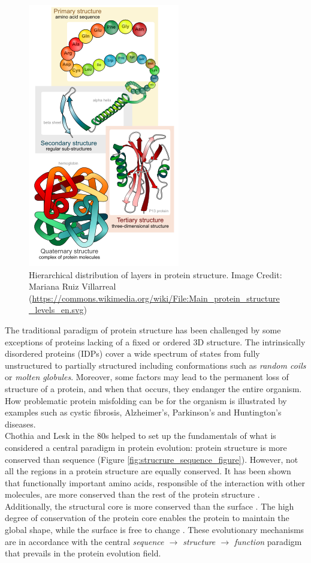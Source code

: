 \documentclass[11pt, b5paper,twoside]{tesi_upf}
\begin{document}
\begin{figure}[htbp]

  \centering
  	\includegraphics[scale=0.85]{../figures/protein_structure_levels_en.png} %

	\caption[Hierarchical distribution of layers in protein structure.]{Hierarchical distribution of layers in protein structure. Image Credit: Mariana Ruiz Villarreal (\url{https://commons.wikimedia.org/wiki/File:Main_protein_structure_levels_en.svg})}
	\label{fig:hierarchy_figure}
\end{figure}
\par The traditional paradigm of protein structure has been challenged by some exceptions of proteins lacking of a fixed or ordered 3D structure. The intrinsically disordered proteins (IDPs) cover a wide spectrum of states from fully unstructured to partially structured including conformations such as \textit{random coils} or \textit{molten globules}. Moreover, some  factors may lead to the permanent loss of structure of a protein, and when that occurs, they endanger the entire organism. How problematic protein misfolding can be for the organism is illustrated by examples such as cystic fibrosis, Alzheimer's, Parkinson's and Huntington's diseases. \\
Chothia and Lesk in the 80s \cite{StructureSequence} helped to set up the fundamentals of what is considered a central paradigm in protein evolution: protein structure is more conserved than sequence (Figure \ref{fig:strucrure_sequence_figure}). However, not all the regions in a protein structure are equally conserved. It has been shown that functionally important amino acids, responsible of the interaction with other molecules, are more conserved than the rest of the protein structure \cite{conservPPI}. Additionally, the structural core is more conserved than the surface \cite{Raj2007}. The high degree of conservation of the protein core enables the protein to maintain the global shape, while the surface is free to change \cite{Todd2001}. These evolutionary mechanisms are in accordance with the central \textit{sequence $\rightarrow$ structure $\rightarrow$ function} paradigm that prevails in the protein evolution field. 
\end{document}
